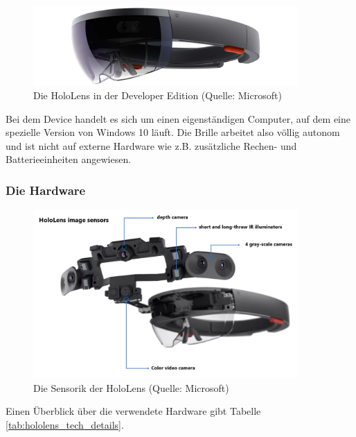 \begin{figure}[h!]
	\centering
	\includegraphics[width=0.9\textwidth]{images/hololens.jpg}
	\caption{Die HoloLens in der Developer Edition (Quelle: Microsoft)}
	\label{img:hololens}
\end{figure}

Bei dem Device handelt es sich um einen eigenständigen Computer, auf dem eine spezielle Version von Windows 10 läuft. Die Brille arbeitet also völlig autonom und ist nicht auf externe Hardware wie z.B. zusätzliche Rechen- und Batterieeinheiten angewiesen.\\

\subsubsection{Die Hardware}
\begin{figure}[h!]
	\centering
	\includegraphics[width=0.9\textwidth]{images/hololens_tech.png}
	\caption{Die Sensorik der HoloLens (Quelle: Microsoft)}
	\label{img:hololens_tech}
\end{figure}

Einen Überblick über die verwendete Hardware gibt Tabelle \ref{tab:hololens_tech_details}.

